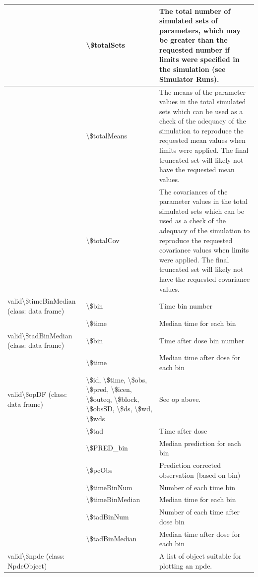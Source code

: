 \documentclass[
]{book}
\begin{document}
\begin{tabular}{l|l|l}
\hline
 & \textbackslash{}\$totalSets & The total number of simulated sets of parameters, which may be greater than the requested number if limits were specified in the simulation (see Simulator Runs).\\
\hline
 & \textbackslash{}\$totalMeans & The means of the parameter values in the total simulated sets which can be used as a check of the adequacy of the simulation to reproduce the requested mean values when limits were applied.  The final truncated set will likely not have the requested mean values.\\
\hline
 & \textbackslash{}\$totalCov & The covariances of the parameter values in the total simulated sets which can be used as a check of the adequacy of the simulation to reproduce the requested covariance values when limits were applied.  The final truncated set will likely not have the requested covariance values.\\
\hline
valid\textbackslash{}\$timeBinMedian (class: data frame) & \textbackslash{}\$bin & Time bin number\\
\hline
 & \textbackslash{}\$time & Median time for each bin\\
\hline
valid\textbackslash{}\$tadBinMedian (class: data frame) & \textbackslash{}\$bin & Time after dose bin number\\
\hline
 & \textbackslash{}\$time & Median time after dose for each bin\\
\hline
valid\textbackslash{}\$opDF (class: data frame) & \textbackslash{}\$id, \textbackslash{}\$time, \textbackslash{}\$obs, \textbackslash{}\$pred, \textbackslash{}\$icen, \textbackslash{}\$outeq, \textbackslash{}\$block, \textbackslash{}\$obsSD, \textbackslash{}\$ds, \textbackslash{}\$wd, \textbackslash{}\$wds & See op above.\\
\hline
 & \textbackslash{}\$tad & Time after dose\\
\hline
 & \textbackslash{}\$PRED\_bin & Median prediction for each bin\\
\hline
 & \textbackslash{}\$pcObs & Prediction corrected observation (based on bin)\\
\hline
 & \textbackslash{}\$timeBinNum & Number of each time bin\\
\hline
 & \textbackslash{}\$timeBinMedian & Median time for each bin\\
\hline
 & \textbackslash{}\$tadBinNum & Number of each time after dose bin\\
\hline
 & \textbackslash{}\$tadBinMedian & Median time after dose for each bin\\
\hline
valid\textbackslash{}\$npde (class: NpdeObject) &  & A list of object suitable for plotting an npde.\\
\hline
\end{tabular}
\end{document}
